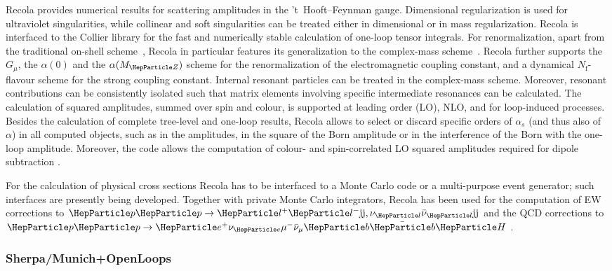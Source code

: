 \documentclass[11pt]{cernrep}
\begin{document}
{\sc Recola} provides numerical results for scattering amplitudes in
the 't~Hooft--Feynman gauge. 
Dimensional regularization is used for ultraviolet singularities,
while collinear and soft singularities can be treated either in
dimensional or in mass regularization. {\sc Recola} is interfaced to
the {\sc Collier} library \cite{Denner:2014gla,collier-hepforge} for
the fast and numerically stable calculation of one-loop tensor
integrals. For renormalization, apart from
the traditional on-shell scheme~\cite{Denner:1991kt}, {\sc Recola} in
particular features its generalization to the complex-mass scheme~\cite{Denner:2005fg}.
{\sc Recola} further supports the $G_\mu$, the $\alpha(0)$ and the
$\alpha(M_{\PZ})$ scheme for the renormalization of the
electromagnetic coupling constant, and a dynamical
$N_{\mathrm{f}}$-flavour scheme for the strong coupling constant. Internal resonant particles can be
treated in the complex-mass scheme. Moreover,
resonant contributions can be consistently isolated such that matrix
elements involving specific intermediate resonances can be calculated. The
calculation of squared amplitudes, summed over spin and colour, is
supported at leading order (LO), NLO, and for loop-induced processes.
Besides the calculation of complete tree-level and one-loop results,
{\sc Recola} allows to select or discard specific orders of $\alpha_s$
(and thus also of $\alpha$) in all computed objects, such as in the
amplitudes, in the square of the Born amplitude or in the interference
of the Born with the one-loop amplitude.  Moreover, the code allows
the computation of colour- and spin-correlated LO squared amplitudes
required for dipole subtraction \cite{Catani:1996vz,Catani:2002hc}.

For the calculation of physical cross sections {\sc Recola} has to be
interfaced to a Monte Carlo code or a multi-purpose event generator;
such interfaces are presently being developed.  Together with private
Monte Carlo integrators, {\sc Recola} has been used for the computation
of EW corrections to $\Pp\Pp \to \Pl^+ \Pl^-{\rm j j},
\nu_{\Pl}\bar\nu_{\Pl}{\rm j j} $ \cite{Denner:2014ina} and the QCD
corrections to $\Pp\Pp\to\Pe^+\nu_{\Pe}
\mu^-\bar{\nu}_\mu\PQb\bar{\PQb}\PH$ \cite{Denner:2015yca}.




\subsubsection*{{\sc Sherpa/Munich+OpenLoops}}
\end{document}
